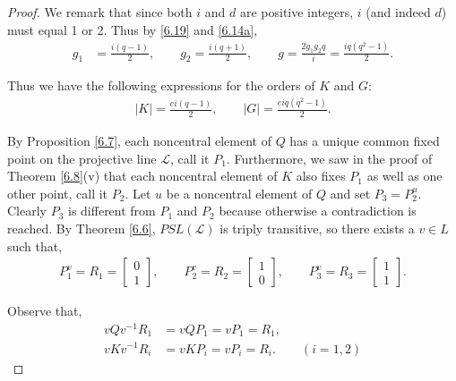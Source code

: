 \begin{proof}
We remark that since both $i$ and $d$ are positive integers, $i$ (and indeed $d$) must equal 1 or 2. Thus by \eqref{6.19} and \eqref{6.14a},
\begin{align*} g_1 &= \frac{i(q-1)}{2}, \qquad g_2 = \frac{i(q + 1)}{2}, \qquad g = \frac{2 g_1 g_2 q}{i} = \frac{iq(q^2 - 1)}{2}.
\end{align*}

Thus we have the following expressions for the orders of $K$ and $G$:
\begin{align}\label{orderGK} |K| = \frac{ei(q-1)}{2}, \qquad |G| = \frac{eiq(q^2-1)}{2}.
\end{align}

By Proposition \ref{6.7}, each noncentral element of $Q$ has a unique common fixed point on the projective line $\mathscr{L}$, call it $P_1$. Furthermore, we saw in the proof of Theorem \ref{6.8}(v) that each noncentral element of $K$ also fixes $P_1$ as well as one other point, call it $P_2$. Let $u$ be a noncentral element of $Q$ and set $P_3 = P_2^u$. Clearly $P_3$ is different from $P_1$ and $P_2$ because otherwise a contradiction is reached. By Theorem \ref{6.6}, $PSL(\mathscr{L})$ is triply transitive, so there exists a $v \in L$ such that,
\begin{align*} P_1^v = R_1 = \begin{bmatrix} 0 \\ 1 \end{bmatrix}, \qquad P_2^v = R_2 = \begin{bmatrix} 1 \\ 0 \end{bmatrix}, \qquad P_3^v = R_3 = \begin{bmatrix} 1 \\ 1 \end{bmatrix}.
\end{align*} 

Observe that,
\begin{align*} vQv^{-1}R_1 &= vQP_1 = vP_1 = R_1,
\\ vKv^{-1}R_i &= vKP_i = vP_i = R_i. \qquad (i=1,2)
\end{align*} 


\end{proof}
